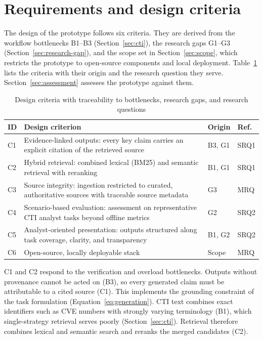 \section{Requirements and design criteria}
\label{sec:requirements}

The design of the prototype follows six criteria. They are derived from
the workflow bottlenecks B1--B3 (Section~\ref{sec:cti}), the research gaps
G1--G3 (Section~\ref{sec:research-gap}), and the scope set in
Section~\ref{sec:scope}, which restricts the prototype to open-source
components and local deployment. Table~\ref{tab:design-criteria} lists the
criteria with their origin and the research question they serve.
Section~\ref{sec:assessment} assesses the prototype against them.

\begin{table}[H]
    \centering
    \small
    \begin{tabular}{lp{}ll}
        \toprule
        \textbf{ID} & \textbf{Design criterion} & \textbf{Origin} & \textbf{Ref.} \\
        \midrule
        C1 & Evidence-linked outputs: every key claim carries an explicit
             citation of the retrieved source & B3, G1 & SRQ1 \\
        C2 & Hybrid retrieval: combined lexical (BM25) and semantic
             retrieval with reranking & B1, G1 & SRQ1 \\
        C3 & Source integrity: ingestion restricted to curated,
             authoritative sources with traceable source metadata & G3 & MRQ \\
        C4 & Scenario-based evaluation: assessment on representative CTI
             analyst tasks beyond offline metrics & G2 & SRQ2 \\
        C5 & Analyst-oriented presentation: outputs structured along task
             coverage, clarity, and transparency & B1, G2 & SRQ2 \\
        C6 & Open-source, locally deployable stack & Scope & MRQ \\
        \bottomrule
    \end{tabular}
    \caption{Design criteria with traceability to bottlenecks, research
             gaps, and research questions}
    \label{tab:design-criteria}
\end{table}

C1 and C2 respond to the verification and overload bottlenecks. Outputs
without provenance cannot be acted on (B3), so every generated claim must
be attributable to a cited source (C1). This implements the grounding
constraint of the task formulation
(Equation~\ref{eq:generation}). CTI text combines exact identifiers such
as CVE numbers with strongly varying terminology (B1), which single-strategy
retrieval serves poorly (Section~\ref{sec:cti}). Retrieval therefore
combines lexical and semantic search and reranks the merged candidates
(C2).

